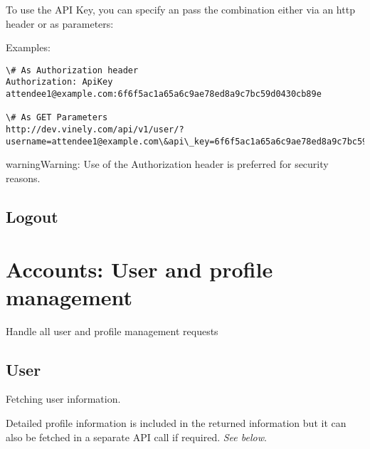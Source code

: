 \documentclass[letterpaper,10pt,english]{sphinxmanual}
\begin{document}
To use the API Key, you can specify an pass the  combination either via an
 http header or as  parameters:

Examples:

\begin{Verbatim}[commandchars=\\\{\}]
\# As Authorization header
Authorization: ApiKey attendee1@example.com:6f6f5ac1a65a6c9ae78ed8a9c7bc59d0430cb89e

\# As GET Parameters
http://dev.vinely.com/api/v1/user/?username=attendee1@example.com\&api\_key=6f6f5ac1a65a6c9ae78ed8a9c7bc59d0430cb89e
\end{Verbatim}

\begin{notice}{warning}{Warning:}
Use of the Authorization header is preferred for security reasons.
\end{notice}


\section{Logout}
\label{auth:logout}

\begin{fulllineitems}
\label{auth:post--api-v1-auth-logout-}
\end{fulllineitems}



\chapter{Accounts: User and profile management}
\label{accounts:ref-accounts}\label{accounts:accounts-user-and-profile-management}\label{accounts::doc}
Handle all user and profile management requests


\section{User}
\label{accounts:user}
Fetching user information.


\begin{fulllineitems}
\label{accounts:get--api-v1-user-}
\end{fulllineitems}


Detailed profile information is included in the returned information but it can
also be fetched in a separate API call if required. \emph{See below}.
\end{document}
